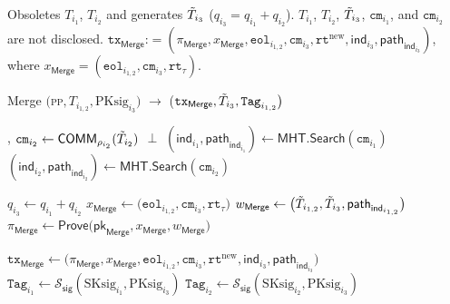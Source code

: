 Obsoletes $T_{i_1}$, $T_{i_2}$ and generates $\Tilde{T}_{i_3}$ ($q_{i_3} = q_{i_1} + q_{i_2}$).  $T_{i_1}$, $T_{i_2}$, $\Tilde{T}_{i_3}$, $\texttt{cm}_{i_1}$, and $\texttt{cm}_{i_2}$ are not disclosed. $\texttt{tx}_\mathsf{Merge} $:$=(\pi_{\mathsf{Merge}}, x_\mathsf{Merge}, \texttt{eol}_{i_{1,2}},  \texttt{cm}_{i_3}, \texttt{rt}^{\text{new}}, \mathsf{ind}_{i_3}, \mathsf{path}_{\mathsf{ind}_{i_3}} )$,
 where $x_\mathsf{Merge} = (\texttt{eol}_{i_{1,2}}, \texttt{cm}_{i_3}, \texttt{rt}_\tau)$.

\begin{algorithm}
\caption{\textsf{Merge} $\big($\textsc{pp}$, T_{i_{1,2}},  \text{PKsig}_{i_3} \big)$ $\rightarrow$ \big($\texttt{tx}_{\textsf{Merge}}, \Tilde{T}_{i_3}, \texttt{Tag}_{i_{1,2}}\big)$}\label{alg:merge}
\begin{algorithmic}[1]
, {$\texttt{cm}_{i_2} \gets \mathsf{COMM}_{\rho_{i_2}}(\Tilde{T}_{i_2}) $}
 {}
\State \Return $\perp$
\EndIf
\State $(\mathsf{ind}_{i_1}, \mathsf{path}_{\mathsf{ind}_{i_1}}) \gets \mathsf{MHT}.\mathsf{Search}(\texttt{cm}_{i_1})$
\State $(\mathsf{ind}_{i_2}, \mathsf{path}_{\mathsf{ind}_{i_2}}) \gets \mathsf{MHT}.\mathsf{Search}(\texttt{cm}_{i_2})$

\State $q_{i_3} \gets q_{i_1} +  q_{i_2}$
\State $x_\textsf{Merge} \gets \big(\texttt{eol}_{i_{1,2}}, \texttt{cm}_{i_3}, \texttt{rt}_\tau \big)$
\State $w_\textsf{Merge} \gets \big( \Tilde{T}_{i_{1,2}}, \Tilde{T}_{i_3}, \mathsf{path}_{\mathsf{ind}_{i_{1,2}}}\big)$
\State $\pi_{\textsf{Merge}} \gets \textsf{Prove}\big(\mathsf{pk}_{\textsf{Merge}}, x_{\textsf{Merge}}, w_{\textsf{Merge}}\big)$

\State$\texttt{tx}_{\textsf{Merge}} \gets \big(\pi_{\textsf{Merge}}, x_{\textsf{Merge}}, \texttt{eol}_{i_{1,2}}, \texttt{cm}_{i_3}, \texttt{rt}^{\text{new}}, \mathsf{ind}_{i_3}, \mathsf{path}_{\mathsf{ind}_{i_3}} \big)$
\State $\texttt{Tag}_{i_1} \leftarrow \mathcal{S}_\mathsf{sig}(\text{SKsig}_{i_1}, \text{PKsig}_{i_3})$
\State $\texttt{Tag}_{i_2} \leftarrow \mathcal{S}_\mathsf{sig}(\text{SKsig}_{i_2}, \text{PKsig}_{i_3})$


\end{algorithmic}
\end{algorithm}
